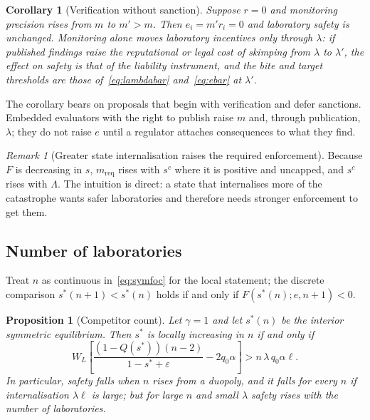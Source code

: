 \documentclass[11pt]{article}
\theoremstyle{plain}
\newtheorem{proposition}{Proposition}
\newtheorem{corollary}{Corollary}
\theoremstyle{definition}
\theoremstyle{remark}
\newtheorem{remark}{Remark}
\newcommand{\Lam}{\Lambda}
\newcommand{\WL}{W_{\!L}}
\begin{document}
\begin{corollary}[Verification without sanction]
Suppose $r=0$ and monitoring precision rises from $m$ to $m'>m$. Then $e_i=m'r_i=0$ and laboratory safety is unchanged. Monitoring alone moves laboratory incentives only through $\lambda$: if published findings raise the reputational or legal cost of skimping from $\lambda$ to $\lambda'$, the effect on safety is that of the liability instrument, and the bite and target thresholds are those of~\eqref{eq:lambdabar} and~\eqref{eq:ebar} at $\lambda'$.
\end{corollary}

The corollary bears on proposals that begin with verification and defer sanctions. Embedded evaluators with the right to publish raise $m$ and, through publication, $\lambda$; they do not raise $e$ until a regulator attaches consequences to what they find.

\begin{remark}[Greater state internalisation raises the required enforcement]
Because $F$ is decreasing in $s$, $m_{\mathrm{req}}$ rises with $s^c$ where it is positive and uncapped, and $s^c$ rises with $\Lam$. The intuition is direct: a state that internalises more of the catastrophe wants safer laboratories and therefore needs stronger enforcement to get them.
\end{remark}

\subsection{Number of laboratories}

Treat $n$ as continuous in~\eqref{eq:symfoc} for the local statement; the discrete comparison $s^*(n+1)<s^*(n)$ holds if and only if $F(s^*(n);e,n+1)<0$.

\begin{proposition}[Competitor count]
Let $\gamma=1$ and let $s^*(n)$ be the interior symmetric equilibrium. Then $s^*$ is locally increasing in $n$ if and only if
\begin{equation}
\WL\left[\frac{(1-Q(s^*))(n-2)}{1-s^*+\varepsilon}-2q_0\alpha\right]>n\,\lambda\,q_0\alpha\ell .
\label{eq:ncond}
\end{equation}
In particular, safety falls when $n$ rises from a duopoly, and it falls for every $n$ if internalisation $\lambda\ell$ is large; but for large $n$ and small $\lambda$ safety rises with the number of laboratories.
\end{proposition}
\end{document}
